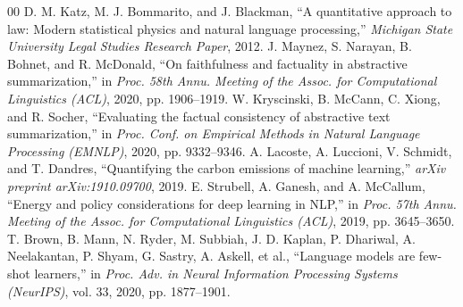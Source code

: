 \documentclass[conference]{IEEEtran}
\begin{document}
\begin{thebibliography}{00}
 D. M. Katz, M. J. Bommarito, and J. Blackman, ``A quantitative approach to law: Modern statistical physics and natural language processing,'' \textit{Michigan State University Legal Studies Research Paper}, 2012.
 J. Maynez, S. Narayan, B. Bohnet, and R. McDonald, ``On faithfulness and factuality in abstractive summarization,'' in \textit{Proc. 58th Annu. Meeting of the Assoc. for Computational Linguistics (ACL)}, 2020, pp. 1906--1919.
 W. Kryscinski, B. McCann, C. Xiong, and R. Socher, ``Evaluating the factual consistency of abstractive text summarization,'' in \textit{Proc. Conf. on Empirical Methods in Natural Language Processing (EMNLP)}, 2020, pp. 9332--9346.
 A. Lacoste, A. Luccioni, V. Schmidt, and T. Dandres, ``Quantifying the carbon emissions of machine learning,'' \textit{arXiv preprint arXiv:1910.09700}, 2019.
 E. Strubell, A. Ganesh, and A. McCallum, ``Energy and policy considerations for deep learning in NLP,'' in \textit{Proc. 57th Annu. Meeting of the Assoc. for Computational Linguistics (ACL)}, 2019, pp. 3645--3650.
 T. Brown, B. Mann, N. Ryder, M. Subbiah, J. D. Kaplan, P. Dhariwal, A. Neelakantan, P. Shyam, G. Sastry, A. Askell, et al., ``Language models are few-shot learners,'' in \textit{Proc. Adv. in Neural Information Processing Systems (NeurIPS)}, vol. 33, 2020, pp. 1877--1901.
\end{thebibliography}
\end{document}
